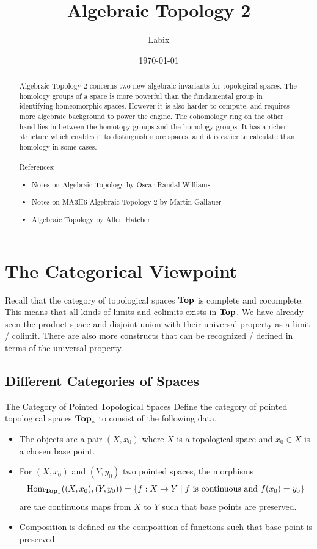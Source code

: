 \documentclass[a4paper]{article}
\title{Algebraic Topology 2}
\author{Labix}
\date{\today}
\begin{document}
\maketitle
\begin{abstract}
Algebraic Topology 2 concerns two new algebraic invariants for topological spaces. The homology groups of a space is more powerful than the fundamental group in identifying homeomorphic spaces. However it is also harder to compute, and requires more algebraic background to power the engine. The cohomology ring on the other hand lies in between the homotopy groups and the homology groups. It has a richer structure which enables it to distinguish more spaces, and it is easier to calculate than homology in some cases. \\~\\

References: 
\begin{itemize}
\item Notes on Algebraic Topology by Oscar Randal-Williams
\item Notes on MA3H6 Algebraic Topology 2 by Martin Gallauer
\item Algebraic Topology by Allen Hatcher
\end{itemize}
\end{abstract}
\pagebreak
\tableofcontents

\pagebreak
\section{The Categorical Viewpoint}
Recall that the category of topological spaces $\bold{Top}$ is complete and cocomplete. This means that all kinds of limits and colimits exists in $\bold{Top}$. We have already seen the product space and disjoint union with their universal property as a limit / colimit. There are also more constructs that can be recognized / defined in terms of the universal property. 

\subsection{Different Categories of Spaces}
\begin{defn}{The Category of Pointed Topological Spaces}{} Define the category of pointed topological spaces $\bold{Top}_\ast$ to consist of the following data. 
\begin{itemize}
\item The objects are a pair $(X,x_0)$ where $X$ is a topological space and $x_0\in X$ is a chosen base point. 
\item For $(X,x_0)$ and $(Y,y_0)$ two pointed spaces, the morphisms $$\operatorname{Hom}_{\bold{Top}_\ast}((X,x_0),(Y,y_0))=\{f:X\to Y\;|\;f\text{ is continuous and }f(x_0)=y_0\}$$ are the continuous maps from $X$ to $Y$ such that base points are preserved. 
\item Composition is defined as the composition of functions such that base point is preserved. 
\end{itemize}
\end{defn}
\end{document}
